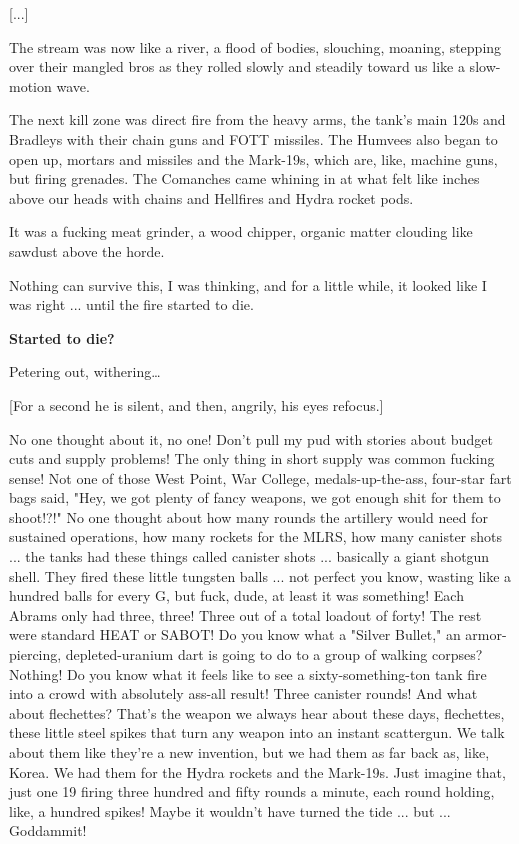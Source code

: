 \documentclass[10pt,a4paper]{article}
\begin{document}
[...]

The stream was now like a river, a flood of bodies, slouching, moaning, stepping over their mangled bros as they rolled slowly and steadily toward us like a slow-motion wave.

The next kill zone was direct fire from the heavy arms, the tank's main 120s and Bradleys with their chain guns and FOTT missiles. The Humvees also began to open up, mortars and missiles and the Mark-19s, which are, like, machine guns, but firing grenades. The Comanches came whining in at what felt like inches above our heads with chains and Hellfires and Hydra rocket pods.

It was a fucking meat grinder, a wood chipper, organic matter clouding like sawdust above the horde.

Nothing can survive this, I was thinking, and for a little while, it looked like I was right ... until the fire started to die.

\textbf{Started to die?}

Petering out, withering…

[For a second he is silent, and then, angrily, his eyes refocus.]

No one thought about it, no one! Don't pull my pud with stories about budget cuts and supply problems! The only thing in short supply was common fucking sense! Not one of those West Point, War College, medals-up-the-ass, four-star fart bags said, "Hey, we got plenty of fancy weapons, we got enough shit for them to shoot!?!" No one thought about how many rounds the artillery would need for sustained operations, how many rockets for the MLRS, how many canister shots ... the tanks had these things called canister shots ... basically a giant shotgun shell. They fired these little tungsten balls ... not perfect you know, wasting like a hundred balls for every G, but fuck, dude, at least it was something! Each Abrams only had three, three! Three out of a total loadout of forty! The rest were standard HEAT or SABOT! Do you know what a "Silver Bullet," an armor-piercing, depleted-uranium dart is going to do to a group of walking corpses? Nothing! Do you know what it feels like to see a sixty-something-ton tank fire into a crowd with absolutely ass-all result! Three canister rounds! And what about flechettes? That's the weapon we always hear about these days, flechettes, these little steel spikes that turn any weapon into an instant scattergun. We talk about them like they're a new invention, but we had them as far back as, like, Korea. We had them for the Hydra rockets and the Mark-19s. Just imagine that, just one 19 firing three hundred and fifty rounds a minute, each round holding, like, a hundred spikes! Maybe it wouldn't have turned the tide ... but ... Goddammit!
\end{document}
